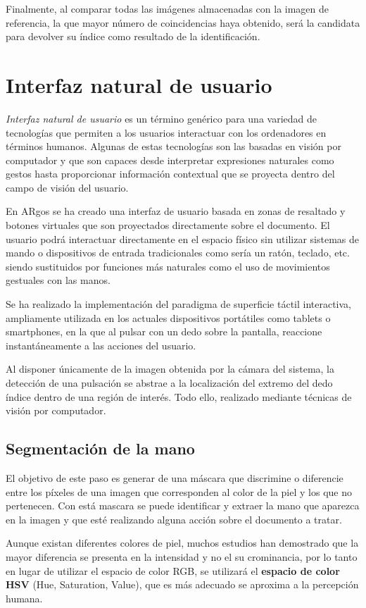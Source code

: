 Finalmente, al comparar todas las imágenes almacenadas con la imagen
de referencia, la que mayor número de coincidencias haya obtenido, será
la candidata para devolver su índice como resultado de la identificación.


\section{Interfaz natural de usuario}

\emph{Interfaz natural de usuario} es un término genérico para una variedad de tecnologías que
permiten a los usuarios interactuar con los ordenadores en términos humanos. Algunas de
estas tecnologías son las basadas en visión por computador y que son
capaces desde interpretar expresiones naturales como gestos hasta proporcionar información contextual que se
proyecta dentro del campo de visión del usuario.

En ARgos se ha creado una interfaz de usuario basada en zonas de
resaltado y botones virtuales que son proyectados directamente sobre
el documento. El usuario podrá interactuar directamente en el espacio físico sin utilizar sistemas de mando o dispositivos de entrada tradicionales como sería un ratón,
teclado, etc. siendo sustituidos por funciones más naturales como el
uso de movimientos gestuales con las manos.

Se ha realizado la implementación del paradigma de superficie táctil interactiva,
ampliamente utilizada en los actuales dispositivos portátiles como
tablets o smartphones, en la que al pulsar con un dedo sobre la
pantalla, reaccione instantáneamente a las acciones del usuario.

Al disponer únicamente de la imagen obtenida por la cámara del
sistema, la detección de una pulsación se abstrae a la localización
del extremo del dedo índice dentro de una región de interés. Todo
ello, realizado mediante técnicas de visión por computador.

\subsection{Segmentación de la mano}
El objetivo de este paso es generar de una máscara que discrimine o
diferencie entre los píxeles de una imagen que corresponden al color
de la piel y los que no pertenecen. Con está mascara se puede identificar y extraer la mano que
aparezca en la imagen y que esté realizando alguna acción sobre el documento a tratar.


Aunque existan diferentes colores de piel, muchos estudios han
demostrado que la mayor diferencia se presenta en la intensidad y no
el su crominancia, por lo tanto en lugar de utilizar el espacio de
color RGB, se utilizará el  \textbf{espacio de color HSV} (Hue, Saturation,
Value), que es más adecuado se aproxima a la percepción humana.


